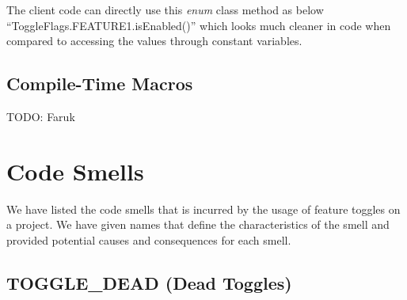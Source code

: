 \documentclass[conference]{IEEEtran}
\begin{document}
The client code can directly use this \textit{enum} class method as below ``ToggleFlags.FEATURE1.isEnabled()'' which looks much cleaner in code when compared to accessing the values through constant variables.

\subsection{Compile-Time Macros}
TODO: Faruk

\section{Code Smells}
\label{discussion}

We have listed the code smells that is incurred by the usage of feature toggles on a project. We have given names that define the characteristics of the smell and provided potential causes and consequences for each smell. 

\subsection{TOGGLE\_DEAD (Dead Toggles)}
\end{document}
